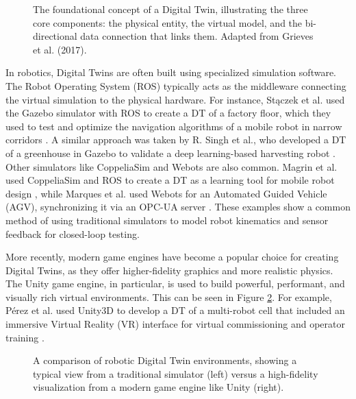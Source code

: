 \begin{figure}[h]
\centering
\caption{The foundational concept of a Digital Twin, illustrating the three core components: the physical entity, the virtual model, and the bi-directional data connection that links them. Adapted from Grieves et al. (2017).}
\label{fig:dt_concept}
\end{figure}

In robotics, Digital Twins are often built using specialized simulation software. The Robot Operating System (ROS) typically acts as the middleware connecting the virtual simulation to the physical hardware. For instance, Stączek et al. used the Gazebo simulator with ROS to create a DT of a factory floor, which they used to test and optimize the navigation algorithms of a mobile robot in narrow corridors \cite{Staczek2021}. A similar approach was taken by R. Singh et al., who developed a DT of a greenhouse in Gazebo to validate a deep learning-based harvesting robot \cite{Singh2024a}. Other simulators like CoppeliaSim and Webots are also common. Magrin et al. used CoppeliaSim and ROS to create a DT as a learning tool for mobile robot design \cite{Magrin2021}, while Marques et al. used Webots for an Automated Guided Vehicle (AGV), synchronizing it via an OPC-UA server \cite{Marques2024}. These examples show a common method of using traditional simulators to model robot kinematics and sensor feedback for closed-loop testing.

More recently, modern game engines have become a popular choice for creating Digital Twins, as they offer higher-fidelity graphics and more realistic physics. The Unity game engine, in particular, is used to build powerful, performant, and visually rich virtual environments. This can be seen in Figure \ref{fig:dt_environments}. For example, Pérez et al. used Unity3D to develop a DT of a multi-robot cell that included an immersive Virtual Reality (VR) interface for virtual commissioning and operator training \cite{Perez2020}.

\begin{figure}[h]
\centering
\caption{A comparison of robotic Digital Twin environments, showing a typical view from a traditional simulator (left) versus a high-fidelity visualization from a modern game engine like Unity (right).}
\label{fig:dt_environments}
\end{figure}

